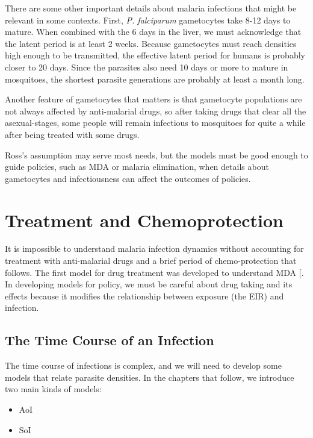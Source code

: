 \documentclass[
]{book}
\begin{document}
There are some other important details about malaria infections that might be relevant in some contexts. First, \emph{P. falciparum} gametocytes take 8-12 days to mature. When combined with the 6 days in the liver, we must acknowledge that the latent period is at least 2 weeks. Because gametocytes must reach densities high enough to be transmitted, the effective latent period for humans is probably closer to 20 days. Since the parasites also need 10 days or more to mature in mosquitoes, the shortest parasite generations are probably at least a month long.

Another feature of gametocytes that matters is that gametocyte populations are not always affected by anti-malarial drugs, so after taking drugs that clear all the asexual-stages, some people will remain infectious to mosquitoes for quite a while after being treated with some drugs.

Ross's assumption may serve most needs, but the models must be good enough to guide policies, such as MDA or malaria elimination, when details about gametocytes and infectiousness can affect the outcomes of policies.

\section{Treatment and Chemoprotection}\label{treatment-and-chemoprotection}

It is impossible to understand malaria infection dynamics without accounting for treatment with anti-malarial drugs and a brief period of chemo-protection that follows. The first model for drug treatment was developed to understand MDA {[}\citeproc{ref-DietzK1975ModelsParasitic}{66}{]}. In developing models for policy, we must be careful about drug taking and its effects because it modifies the relationship between exposure (the EIR) and infection.

\subsection{The Time Course of an Infection}\label{the-time-course-of-an-infection}

The time course of infections is complex, and we will need to develop some models that relate parasite densities. In the chapters that follow, we introduce two main kinds of models:

\begin{itemize}
\item
  AoI
\item
  SoI
\end{itemize}
\end{document}
